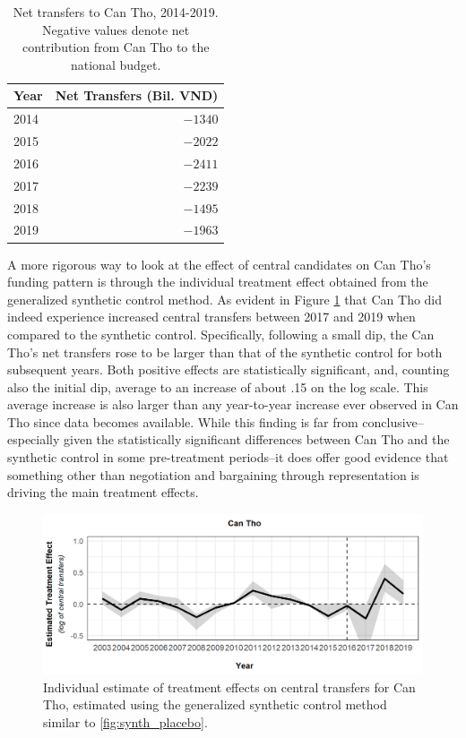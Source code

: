 \documentclass[12pt]{article}
\newcommand{\1}{\mathbbm{1}}
\begin{document}
\begin{table}[]
	\centering
	\caption{Net transfers to Can Tho, 2014-2019. Negative values denote net contribution from Can Tho to the national budget.}
	\label{tab:fund_CanTho}
	\begin{tabular}{@{}lr@{}}
		\toprule
		Year & \multicolumn{1}{c}{Net Transfers (Bil. VND)}  \\ \midrule
		2014 & $-1340$                    \\
		2015 & $-2022$                    \\
		2016 & $-2411$                    \\ \midrule
		2017 & $-2239$                    \\
		2018 & $-1495$                   \\
		2019 & $-1963$                    \\ \bottomrule
	\end{tabular}
\end{table}

A more rigorous way to look at the effect of central candidates on Can Tho's funding pattern is through the individual treatment effect obtained from the generalized synthetic control method. As evident in Figure \ref{fig:synth_mech} that Can Tho did indeed experience increased central transfers between 2017 and 2019 when compared to the synthetic control. Specifically, following a small dip, the Can Tho's net transfers rose to be larger than that of the synthetic control for both subsequent years. Both positive effects are statistically significant, and, counting also the initial dip, average to an increase of about .15 on the log scale. This average increase is also larger than any year-to-year increase ever observed in Can Tho since data becomes available. While this finding is far from conclusive--especially given the statistically significant differences between Can Tho and the synthetic control in some pre-treatment periods--it does offer good evidence that something other than negotiation and bargaining through representation is driving the main treatment effects.

\begin{figure}[!htb]
	\centering
	\includegraphics[]{figure/210202_synth_results_CanTho.png}
	\captionsetup{singlelinecheck=off}
	\caption[Individual synthetic control treatment effect]{Individual estimate of treatment effects on central transfers for Can Tho, estimated using the generalized synthetic control method similar to \autoref{fig:synth_placebo}.}
	\label{fig:synth_mech}
\end{figure}
\end{document}
